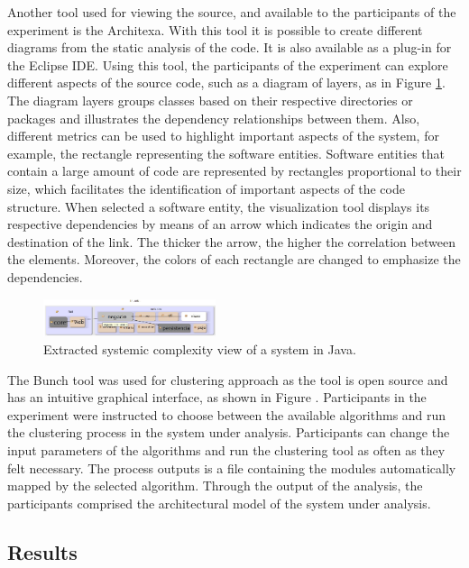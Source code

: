 \documentclass{sig-alternate-05-2015}
\begin{document}
Another tool used for viewing the source, and available to the participants of the experiment is the Architexa. With this tool it is possible to create different diagrams from the static analysis of the code. It is also available as a plug-in for the Eclipse IDE. Using this tool, the participants of the experiment can explore different aspects of the source code, such as a diagram of layers, as in Figure \ref{diagrama_architex}. The diagram layers groups classes based on their respective directories or packages and illustrates the dependency relationships between them. Also, different metrics can be used to highlight important aspects of the system, for example, the rectangle representing the software entities. Software entities that contain a large amount of code are represented by rectangles proportional to their size, which facilitates the identification of important aspects of the code structure. When selected a software entity, the visualization tool displays its respective dependencies by means of an arrow which indicates the origin and destination of the link. The thicker the arrow, the higher the correlation between the elements. Moreover, the colors of each rectangle are changed to emphasize the dependencies.


\begin{figure}[!h]
	\centering
	\includegraphics[width=0.45\textwidth]{6_diagrama_architex_2}
	\caption{Extracted systemic complexity view of a system in Java.}
	\label{diagrama_architex}
\end{figure}


The Bunch tool \cite{mitchell_heuristic_2002} was used for clustering approach as the tool is open source and has an intuitive graphical interface, as shown in Figure . Participants in the experiment were instructed to choose between the available algorithms and run the clustering process in the system under analysis. Participants can change the input parameters of the algorithms and run the clustering tool as often as they felt necessary. The process outputs is a file containing the modules automatically mapped by the selected algorithm. Through the output of the analysis, the participants comprised the architectural model of the system under analysis.


\subsection{Results}%
\end{document}
